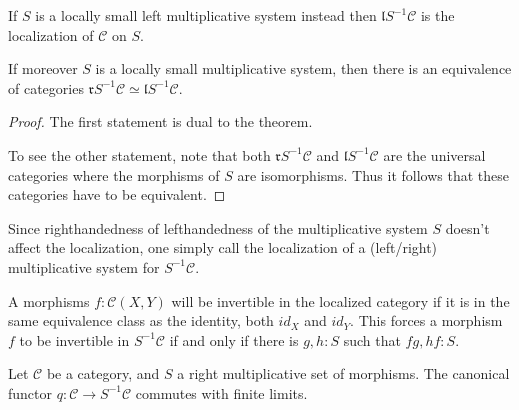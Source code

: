     \begin{corollary}
        If $S$ is a locally small left multiplicative system instead then $\mathfrak{l}S^{-1}\mathcal{C}$ is the localization of $\mathcal{C}$ on $S$.

        If moreover $S$ is a locally small multiplicative system, then there is an equivalence of categories $\mathfrak{r}S^{-1}\mathcal{C}\simeq\mathfrak{l}S^{-1}\mathcal{C}$.
    \end{corollary}

    \begin{proof}
        The first statement is dual to the theorem.

        To see the other statement, note that both $\mathfrak{r}S^{-1}\mathcal{C}$ and $\mathfrak{l}S^{-1}\mathcal{C}$ are the universal categories where the morphisms of $S$ are isomorphisms. Thus it follows that these categories have to be equivalent.
    \end{proof}

    \begin{remark}
        Since righthandedness of lefthandedness of the multiplicative system $S$ doesn't affect the localization, one simply call the localization of a (left/right) multiplicative system for $S^{-1}\mathcal{C}$.
    \end{remark}

    \begin{remark}
        A morphisms $f:\mathcal{C}(X,Y)$ will be invertible in the localized category if it is in the same equivalence class as the identity, both $id_X$ and $id_Y$. This forces a morphism $f$ to be invertible in $S^{-1}\mathcal{C}$ if and only if there is $g,h:S$ such that $fg,hf:S$.
    \end{remark}

    \begin{prop}
        Let $\mathcal{C}$ be a category, and $S$ a right multiplicative set of morphisms. The canonical functor $q:\mathcal{C}\rightarrow S^{-1}\mathcal{C}$ commutes with finite limits.
    \end{prop}


